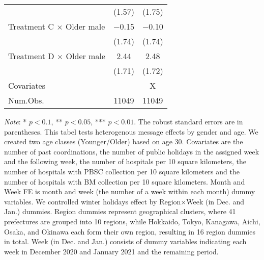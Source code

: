 \documentclass[12pt, a4paper]{article}
\begin{document}
\begin{table}[H]
\begin{threeparttable}
\begin{tabular}[t]{lcc}
 & (\num{1.57}) & (\num{1.75})\\
Treatment C $\times$ Older male & \num{-0.15} & \num{-0.10}\\
 & (\num{1.74}) & (\num{1.74})\\
Treatment D $\times$ Older male & \num{2.44} & \num{2.48}\\
 & (\num{1.71}) & (\num{1.72})\\
\midrule
Covariates &  & X\\
Num.Obs. & \num{11049} & \num{11049}\\
\bottomrule
\end{tabular}
\begin{tablenotes}
\item \emph{Note}: * $p < 0.1$, ** $p < 0.05$, *** $p < 0.01$. The robust standard errors are in parentheses. This tabel tests heterogenous message effects by gender and age. We created two age classes (Younger/Older) based on age 30. Covariates are the number of past coordinations, the number of public holidays in the assigned week and the following week, the number of hospitals per 10 square kilometers, the number of hospitals with PBSC collection per 10 square kilometers and the number of hospitals with BM collection per 10 square kilometers. Month and Week FE is month and week (the number of a week within each month) dummy variables. We controlled winter holidays effect by Region$\times$Week (in Dec. and Jan.) dummies. Region dummies represent geographical clusters, where 41 prefectures are grouped into 10 regions, while Hokkaido, Tokyo, Kanagawa, Aichi, Osaka, and Okinawa each form their own region, resulting in 16 region dummies in total. Week (in Dec. and Jan.) consists of dummy variables indicating each week in December 2020 and January 2021 and the remaining period.
\end{tablenotes}
\end{threeparttable}
\end{table}
\end{document}
